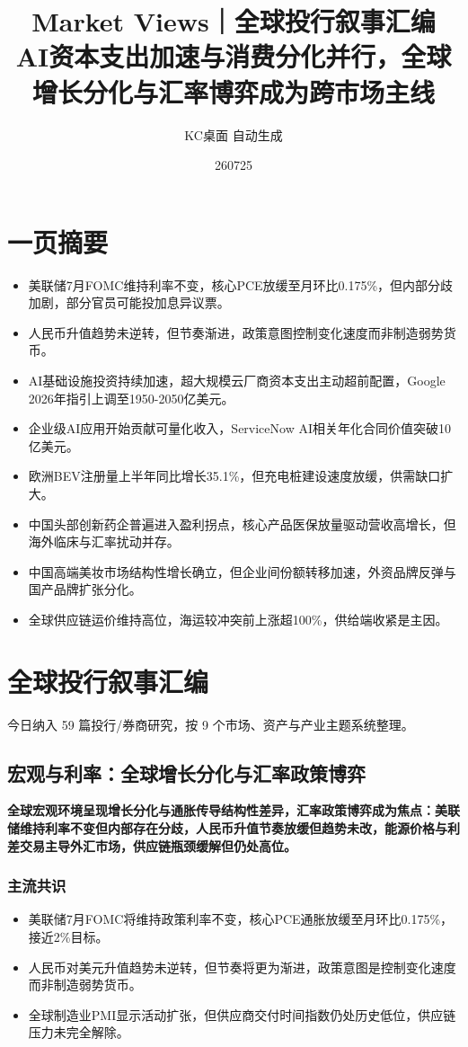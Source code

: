 \documentclass[11pt]{ctexart}
\title{\textbf{Market Views｜全球投行叙事汇编}\\[0.4em]{\large AI资本支出加速与消费分化并行，全球增长分化与汇率博弈成为跨市场主线}}
\author{KC桌面 自动生成}
\date{260725}
\begin{document}
\maketitle
\tableofcontents
\newpage
\section{一页摘要}
\begin{itemize}
  \item 美联储7月FOMC维持利率不变，核心PCE放缓至月环比0.175\%，但内部分歧加剧，部分官员可能投加息异议票。
  \item 人民币升值趋势未逆转，但节奏渐进，政策意图控制变化速度而非制造弱势货币。
  \item AI基础设施投资持续加速，超大规模云厂商资本支出主动超前配置，Google 2026年指引上调至1950-2050亿美元。
  \item 企业级AI应用开始贡献可量化收入，ServiceNow AI相关年化合同价值突破10亿美元。
  \item 欧洲BEV注册量上半年同比增长35.1\%，但充电桩建设速度放缓，供需缺口扩大。
  \item 中国头部创新药企普遍进入盈利拐点，核心产品医保放量驱动营收高增长，但海外临床与汇率扰动并存。
  \item 中国高端美妆市场结构性增长确立，但企业间份额转移加速，外资品牌反弹与国产品牌扩张分化。
  \item 全球供应链运价维持高位，海运较冲突前上涨超100\%，供给端收紧是主因。
\end{itemize}
\section{全球投行叙事汇编}
今日纳入 59 篇投行/券商研究，按 9 个市场、资产与产业主题系统整理。
\newpage
\subsection{宏观与利率：全球增长分化与汇率政策博弈}
\textbf{全球宏观环境呈现增长分化与通胀传导结构性差异，汇率政策博弈成为焦点：美联储维持利率不变但内部存在分歧，人民币升值节奏放缓但趋势未改，能源价格与利差交易主导外汇市场，供应链瓶颈缓解但仍处高位。}
\subsubsection*{主流共识}
\begin{itemize}
  \item 美联储7月FOMC将维持政策利率不变，核心PCE通胀放缓至月环比0.175\%，接近2\%目标。
  \item 人民币对美元升值趋势未逆转，但节奏将更为渐进，政策意图是控制变化速度而非制造弱势货币。
  \item 全球制造业PMI显示活动扩张，但供应商交付时间指数仍处历史低位，供应链压力未完全解除。
\end{itemize}
\end{document}
